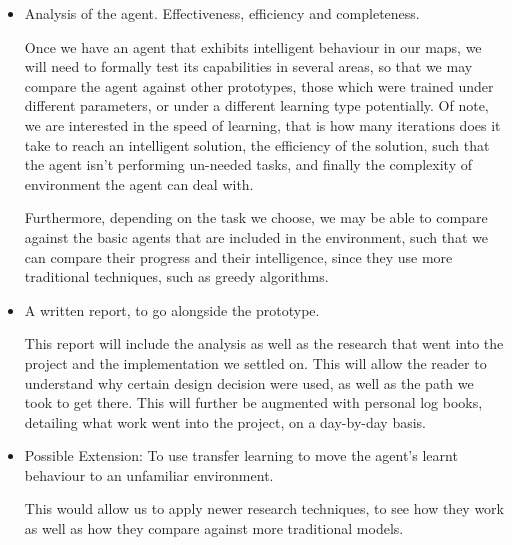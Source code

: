 \documentclass[12pt]{article}
\begin{document}
\begin{itemize}
    \item Analysis of the agent. Effectiveness, efficiency and completeness.

          Once we have an agent that exhibits intelligent behaviour in our maps,
          we will need to formally test its capabilities in several areas, so
          that we may compare the agent against other prototypes, those
          which were trained under different parameters, or under a different
          learning type potentially. Of note, we are interested in the speed
          of learning, that is how many iterations does it take to reach an
          intelligent solution, the efficiency of the solution, such that the
          agent isn’t performing un-needed tasks, and finally the
          complexity of environment the agent can deal with.

          Furthermore, depending on the task we choose, we may be able to
          compare against the basic agents that are included in the
          \cite{pysc2} environment, such that we can compare their progress
          and their intelligence, since they use more traditional techniques,
          such as greedy algorithms.

    \item A written report, to go alongside the prototype.

          This report will include the analysis as well as the research that
          went into the project and the implementation we settled on.
          This will allow the reader to understand why certain design
          decision were used, as well as the path we took to get there.
          This will further be augmented with personal log books,
          detailing what work went into the project, on a day-by-day basis.

    \item Possible Extension: To use transfer learning to move the agent’s
          learnt behaviour to an unfamiliar environment.

          This would allow us to apply newer research techniques,
          to see how they work as well as how they compare against
          more traditional models.
\end{itemize}
\end{document}
